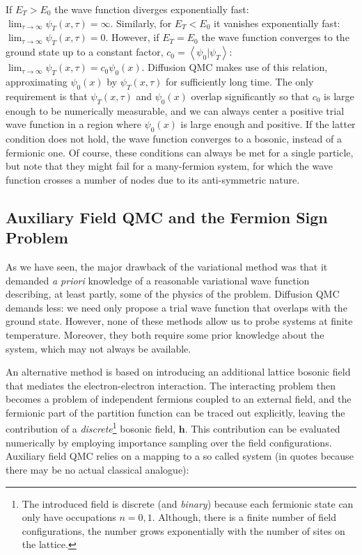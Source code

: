If $E_T > E_0$ the wave function diverges exponentially fast: $\lim_{\tau \rightarrow \infty} \psi_T ( x, \tau) = \infty$.
Similarly, for $E_T < E_0$ it vanishes exponentially fast: $\lim_{\tau \rightarrow \infty} \psi_T ( x, \tau) = 0$.
However, if $E_T = E_0$ the wave function converges to the ground state up to a constant factor, $c_0 = \left\langle \psi_0 | \psi_T \right\rangle$: 
$
\lim_{\tau \rightarrow \infty} \psi_T ( x, \tau) = c_0 \psi_0 (x)
$.
Diffusion \ac{QMC} makes use of this relation, approximating $\psi_0(x)$ by $\psi_T (x, \tau)$ for sufficiently long time.
The only requirement is that $\psi_T (x, \tau)$ and $\psi_0(x)$ overlap significantly so that $c_0$ is large enough to be numerically measurable, and we can always center a positive trial wave function in a region where $\psi_0(x)$ is large enough and positive.
If the latter condition does not hold, the wave function converges to a bosonic, instead of a fermionic one.
Of course, these conditions can always be met for a single particle, but note that they might fail for a many-fermion system, for which the wave function crosses a number of nodes due to its anti-symmetric nature.

\subsection{Auxiliary Field \acs{QMC} and the Fermion Sign Problem}
\label{subsec:introAFQMC}

As we have seen, the major drawback of the variational method was that it demanded \emph{a priori} knowledge of a reasonable variational wave function describing, at least partly, some of the physics of the problem.
Diffusion \acs{QMC} demands less: we need only propose a trial wave function that overlaps with the ground state.
However, none of these methods allow us to probe systems at finite temperature.
Moreover, they both require some prior knowledge about the system, which may not always be available.

An alternative method is based on introducing an additional lattice bosonic field that mediates the electron-electron interaction.
The interacting problem then becomes a problem of independent fermions coupled to an external field, and the fermionic part of the partition function can be traced out explicitly, leaving the contribution of a \emph{discrete}\footnote{The introduced field is discrete (and \emph{binary}) because each fermionic state can only have occupations $n = 0, 1$. Although, there is a finite number of field configurations, the number grows exponentially with the number of sites on the lattice.} bosonic field, $\bm h$.
This contribution can be evaluated numerically by employing importance sampling over the field configurations.
Auxiliary field \acs{QMC} relies on a mapping to a so called  system (in quotes because there may be no actual classical analogue):

